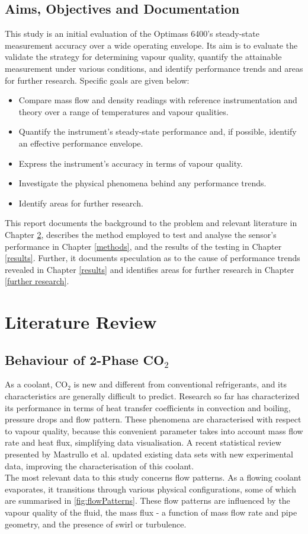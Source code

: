 \documentclass{report}
\begin{document}
\section{Aims, Objectives and Documentation}
This study is an initial evaluation of the Optimass 6400's steady-state measurement accuracy over a wide operating envelope. Its aim is to evaluate the validate the strategy for determining vapour quality, quantify the attainable measurement under various conditions, and identify performance trends and areas for further research. Specific goals are given below:
\begin{itemize}
\item{Compare mass flow and density readings with reference instrumentation and theory over a range of temperatures and vapour qualities.}
\item{Quantify the instrument's steady-state performance and, if possible, identify an effective performance envelope.}
\item{Express the instrument's accuracy in terms of vapour quality.}
\item{Investigate the physical phenomena behind any performance trends.}
\item{Identify areas for further research.}
\end{itemize}
This report documents the background to the problem and relevant literature in Chapter \ref{litReview}, describes the method employed to test and analyse the sensor's performance in Chapter \ref{methods}, and the results of the testing in Chapter \ref{results}. Further, it documents speculation as to the cause of performance trends revealed in Chapter \ref{results} and identifies areas for further research in Chapter \ref{further research}.


\chapter{Literature Review} \label{litReview}
\section{Behaviour of 2-Phase CO$_2$} \label{behaviour}
As a coolant, CO$_2$ is new and different from conventional refrigerants, and its characteristics are generally difficult to predict. Research so far has characterized its performance in terms of heat transfer coefficients in convection and boiling, pressure drops and flow pattern. These phenomena are characterised with respect to vapour quality, because this convenient parameter takes into account mass flow rate and heat flux, simplifying data visualisation. A recent statistical review presented by Mastrullo et al. updated existing data sets with new experimental data, improving the characterisation of this coolant. \cite{Mastrullo 2010}\\
The most relevant data to this study concerns flow patterns. As a flowing coolant evaporates, it transitions through various physical configurations, some of which are summarised in \ref{fig:flowPatterns}. These flow patterns are influenced by the vapour quality of the fluid, the mass flux - a function of mass flow rate and pipe geometry, and the presence of swirl or turbulence.
\end{document}
